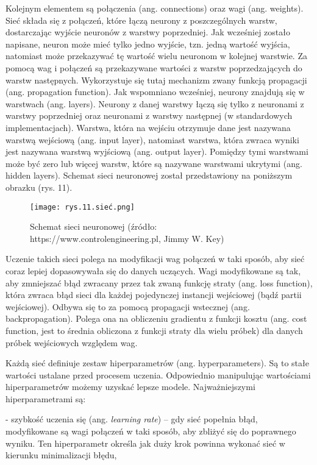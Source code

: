 Kolejnym elementem są połączenia (ang. connections) oraz wagi (ang. weights). Sieć składa się z połączeń, które łączą neurony z poszczególnych warstw, dostarczając wyjście neuronów z warstwy poprzedniej. Jak wcześniej zostało napisane, neuron może mieć tylko jedno wyjście, tzn. jedną wartość wyjścia, natomiast może przekazywać tę wartość wielu neuronom w kolejnej warstwie. Za pomocą wag i połączeń są przekazywane wartości z warstw poprzedzających do warstw następnych. Wykorzystuje się tutaj mechanizm zwany funkcją propagacji (ang. propagation function). Jak wspomniano wcześniej, neurony znajdują się w warstwach (ang. layers). Neurony z danej warstwy łączą się tylko z neuronami z warstwy poprzedniej oraz neuronami z warstwy następnej (w standardowych implementacjach). Warstwa, która na wejściu otrzymuje dane jest nazywana warstwą wejściową (ang. input layer), natomiast warstwa, która zwraca wyniki jest nazywana warstwą wyjściową (ang. output layer). Pomiędzy tymi warstwami może być zero lub więcej warstw, które są nazywane warstwami ukrytymi (ang. hidden layers). Schemat sieci neuronowej został przedstawiony na poniższym obrazku (rys. 11). 
\begin{figure}[h]
    \centering
    \texttt{[image: rys.11.sieć.png]}
    \caption{Schemat sieci neuronowej (źródło: https://www.controlengineering.pl, Jimmy W. Key)}
    \label{fig:mesh11}
\end{figure}
Uczenie takich sieci polega na modyfikacji wag połączeń w taki sposób, aby sieć coraz lepiej dopasowywała się do danych uczących. Wagi modyfikowane są tak, aby zmniejszać błąd zwracany przez tak zwaną funkcję straty (ang. loss function), która zwraca błąd sieci dla każdej pojedynczej instancji wejściowej (bądź partii wejściowej). Odbywa się to za pomocą propagacji wstecznej (ang. backpropagation). Polega ona na obliczeniu gradientu z funkcji kosztu (ang. cost function, jest to średnia obliczona z funkcji straty dla wielu próbek) dla danych próbek wejściowych względem wag. 

Każdą sieć definiuje zestaw hiperparametrów (ang. hyperparameters). Są to stałe wartości ustalane przed procesem uczenia. Odpowiednio manipulując wartościami hiperparametrów możemy uzyskać lepsze modele. Najważniejszymi hiperparametrami są:

- szybkość uczenia się (ang. \textit{learning rate}) – gdy sieć popełnia błąd, modyfikowane są wagi połączeń w taki sposób, aby zbliżyć się do poprawnego wyniku. Ten hiperparametr określa jak duży krok powinna wykonać sieć w kierunku minimalizacji błędu,


